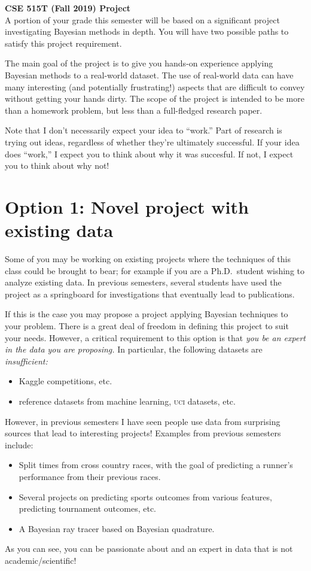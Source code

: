 \documentclass{article}
\newcommand{\acro}[1]{\textsc{\MakeLowercase{#1}}}
\begin{document}
{\large \textbf{CSE 515T (Fall 2019) Project}} \\

A portion of your grade this semester will be based on a significant
project investigating Bayesian methods in depth. You will have two
possible paths to satisfy this project requirement.

The main goal of the project is to give you hands-on experience
applying Bayesian methods to a real-world dataset.  The use of
real-world data can have many interesting (and potentially
frustrating!) aspects that are difficult to convey without getting
your hands dirty.  The scope of the project is intended to be more
than a homework problem, but less than a full-fledged research paper.

Note that I don't necessarily expect your idea to ``work.''  Part of
research is trying out ideas, regardless of whether they're ultimately
successful.  If your idea does ``work,'' I expect you to think about
why it was succesful.  If not, I expect you to think about why not!

\clearpage

\section*{Option 1: Novel project with existing data}

Some of you may be working on existing projects where the techniques
of this class could be brought to bear; for example if you are a
Ph.D.\ student wishing to analyze existing data. In previous
semesters, several students have used the project as a springboard for
investigations that eventually lead to publications.

If this is the case you may propose a project applying Bayesian
techniques to your problem. There is a great deal of freedom in
defining this project to suit your needs. However, a critical
requirement to this option is that \emph{you be an expert in the data
  you are proposing.} In particular, the following datasets are
\emph{insufficient:}
\begin{itemize}
\item Kaggle competitions, etc.
\item reference datasets from machine learning, \acro{UCI} datasets, etc.
\end{itemize}

However, in previous semesters I have seen people use data from
surprising sources that lead to interesting projects! Examples from
previous semesters include:
\begin{itemize}
\item Split times from cross country races, with the goal of predicting
  a runner's performance from their previous races.
\item Several projects on predicting sports outcomes from various features,
  predicting tournament outcomes, etc.
\item
  A Bayesian ray tracer based on Bayesian quadrature.
\end{itemize}
As you can see, you can be passionate about and an expert in data that
is not academic/scientific!
\end{document}
